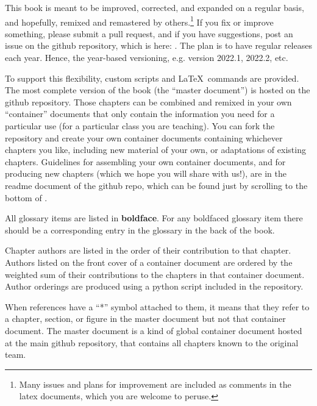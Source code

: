 This book is meant to be improved, corrected, and expanded on a regular basis, and hopefully, remixed and remastered by others.\footnote{Many issues and plans for improvement are included as comments in the latex documents, which you are welcome to peruse.} If you fix or improve something, please submit a pull request, and if you have suggestions, post an issue on the github repository, which is here: . The plan is to have regular releases each year. Hence, the year-based versioning, e.g. version 2022.1, 2022.2, etc.

To support this flexibility, custom scripts and \LaTeX~commands are provided. The most complete version of the book (the ``master document'') is hosted on the github repository. Those chapters can be combined and remixed in your own ``container'' documents that only contain the information you need for a particular use (\eg for a particular class you are teaching). You can fork the repository and  create your own container documents containing whichever chapters you like, including new material of your own, or adaptations of existing chapters. Guidelines for assembling your own container documents, and for producing new chapters (which we hope you will share with us!), are in the readme document of the github repo, which can be found just by scrolling to the bottom of .


All glossary items are listed in \textbf{boldface}. For any boldfaced glossary item there should be a corresponding entry in the glossary in the back of the book.

Chapter authors are listed in the order of their contribution to that chapter. Authors listed on the front cover of a container document are ordered by the weighted sum of their contributions to the chapters in that container document. Author orderings are produced using a python script included in the repository.

When references have a ``*'' symbol attached to them, it means that they refer to a chapter, section, or figure in the master document but not that container document. The master document is a kind of global container document hosted at the main github repository, that contains all chapters known to the original team.

